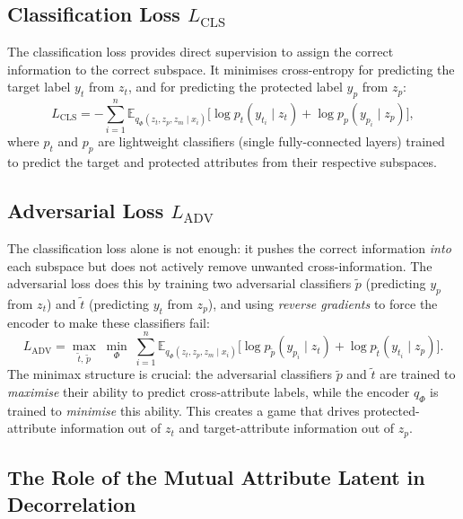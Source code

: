 \subsection{Classification Loss \texorpdfstring{$L_\text{CLS}$}{L\_CLS}}
\label{ssec:lcls}

The classification loss provides direct supervision to assign the correct information to the correct
subspace. It minimises cross-entropy for predicting the target label $y_t$ from $z_t$, and for
predicting the protected label $y_p$ from $z_p$:
\begin{equation}
    L_\text{CLS} = -\sum_{i=1}^{n}
        \mathbb{E}_{q_\Phi(z_t, z_p, z_m \mid x_i)}\!\Big[
            \log p_t(y_{t_i} \mid z_t) + \log p_p(y_{p_i} \mid z_p)
        \Big],
    \label{eq:lcls}
\end{equation}
where $p_t$ and $p_p$ are lightweight classifiers (single fully-connected layers) trained to predict the
target and protected attributes from their respective subspaces.

\subsection{Adversarial Loss \texorpdfstring{$L_\text{ADV}$}{L\_ADV}}
\label{ssec:ladv}

The classification loss alone is not enough: it pushes the correct information \emph{into} each
subspace but does not actively remove unwanted cross-information. The adversarial loss does this by
training two adversarial classifiers $\tilde{p}$ (predicting $y_p$ from $z_t$) and $\tilde{t}$
(predicting $y_t$ from $z_p$), and using \emph{reverse gradients} to force the encoder to make these
classifiers fail:
\begin{equation}
    L_\text{ADV} = \max_{\tilde{t},\, \tilde{p}}\;
        \min_{\Phi}\; \sum_{i=1}^{n}
        \mathbb{E}_{q_\Phi(z_t, z_p, z_m \mid x_i)}\!\Big[
            \log p_{\tilde{p}}(y_{p_i} \mid z_t) + \log p_{\tilde{t}}(y_{t_i} \mid z_p)
        \Big].
    \label{eq:ladv}
\end{equation}
The minimax structure is crucial: the adversarial classifiers $\tilde{p}$ and $\tilde{t}$ are
trained to \emph{maximise} their ability to predict cross-attribute labels, while the encoder
$q_\Phi$ is trained to \emph{minimise} this ability. This creates a game that drives protected-attribute
information out of $z_t$ and target-attribute information out of $z_p$.

\subsection{The Role of the Mutual Attribute Latent in Decorrelation}

